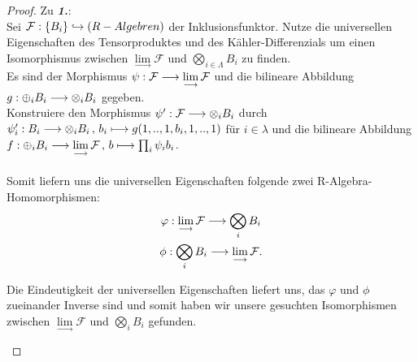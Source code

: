 \documentclass[10pt,a4paper]{report}
\newcommand{\functionfront}[3]{\nolinebreak{#1:#2 \longrightarrow #3}}
\newcommand{\function}[5]{\nolinebreak{#1:#2 \longrightarrow #3 \, , \, #4 \longmapsto #5}}
\newcommand{\colimes}[0]{\lim\limits_{ \longrightarrow }}
\newcommand{\infunctionfront}[3]{\nolinebreak{#1:#2 \hookrightarrow #3}}
\begin{document}
\begin{proof}
Zu \textit{\textbf{1.}}:\\
Sei $\infunctionfront{\mathcal{F}}{\lbrace B_i \rbrace}{(R-Algebren)}$ der Inklusionsfunktor. Nutze die universellen Eigenschaften des Tensorproduktes und des Kähler-Differenzials um einen Isomorphismus zwischen $\colimes \mathcal{F}$ und $\bigotimes_{i \in \Lambda} B_i$ zu finden.\\ Es sind der Morphismus $\functionfront{\psi}{\mathcal{F}}{\colimes \mathcal{F}}$ und die bilineare Abbildung $\functionfront{g}{\oplus_i B_i}{\otimes_i B_i}$ gegeben.\\
Konstruiere den Morphismus $\functionfront{\psi'}{\mathcal{F}}{\otimes_i B_i}$ durch $\function{\psi'_i}{B_i}{\otimes_i B_i}{b_i}{g(1,..,1,b_i,1,..,1)}$ für $i \in \lambda$ und die bilineare Abbildung $\function{f}{\oplus_i B_i}{\colimes \mathcal{F}}{b}{\prod_i \psi_i b_i}$.\\
\ \\
Somit liefern uns die universellen Eigenschaften folgende zwei R-Algebra-Homomorphismen:
\begin{gather*}
\functionfront{\varphi}{\colimes \mathcal{F}}{\bigotimes_i B_i} \\
\functionfront{\phi}{\bigotimes_i B_i}{\colimes \mathcal{F}}.
\end{gather*}
\begin{center}
\end{center}
Die Eindeutigkeit der universellen Eigenschaften liefert uns, das $\varphi$ und $\phi$ zueinander Inverse sind und somit haben wir unsere gesuchten Isomorphismen zwischen $\colimes \mathcal{F}$ und $\bigotimes_i B_i$ gefunden.
\begin{center}
\end{center}
\end{proof}
\end{document}
